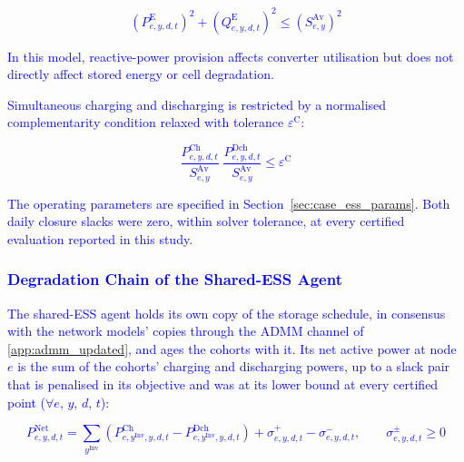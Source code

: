 \documentclass[preprint,12pt]{elsarticle}
\begin{document}
\textcolor{blue}{
    \begin{equation}
        \left(P^{\text{E}}_{e,y,d,t}\right)^2
        + \left(Q^{\text{E}}_{e,y,d,t}\right)^2
        \le \left(S^{\text{Av}}_{e,y}\right)^2
        \label{eq:converter_capability}
    \end{equation}
}

\textcolor{blue}{
    In this model, reactive-power provision affects converter utilisation but does not directly affect stored energy or cell degradation.
}

\textcolor{blue}{Simultaneous charging and discharging is restricted by a normalised complementarity condition relaxed with tolerance $\varepsilon^{\text{C}}$:}

\textcolor{blue}{
    \begin{equation}
        \frac{P^{\text{Ch}}_{e,y,d,t}}{S^{\text{Av}}_{e,y}} \; \frac{P^{\text{Dch}}_{e,y,d,t}}{S^{\text{Av}}_{e,y}} \le \varepsilon^{\text{C}}
        \label{eq:network_complementarity}
    \end{equation}
}

\textcolor{blue}{
    The operating parameters are specified in Section~\ref{sec:case_ess_params}.
    Both daily closure slacks were zero, within solver tolerance, at every certified evaluation reported in this study.
}

\subsubsection{\textcolor{blue}{Degradation Chain of the Shared-ESS Agent}}

\textcolor{blue}{The shared-ESS agent holds its own copy of the storage schedule, in consensus with the network models' copies through the ADMM channel of \ref{app:admm_updated}, and ages the cohorts with it. Its net active power at node $e$ is the sum of the cohorts' charging and discharging powers, up to a slack pair that is penalised in its objective and was at its lower bound at every certified point ($\forall e$, $y$, $d$, $t$):}

\textcolor{blue}{
    \begin{equation}
        P^{\text{Net}}_{e,y,d,t} = \sum_{y^\text{Inv}} \left( P^{\text{Ch}}_{e,y^\text{Inv},y,d,t} - P^{\text{Dch}}_{e,y^\text{Inv},y,d,t} \right)
        + \sigma^{+}_{e,y,d,t} - \sigma^{-}_{e,y,d,t}, \qquad \sigma^{\pm}_{e,y,d,t} \ge 0
        \label{eq:esso_net_power}
    \end{equation}
}
\end{document}
